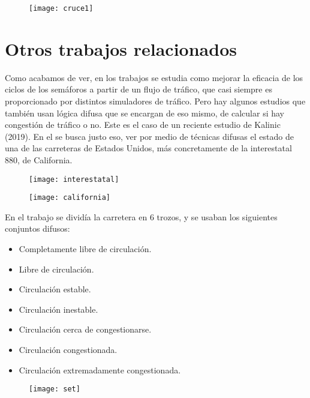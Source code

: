 \begin{figure}[H]
	\centering
	\texttt{[image: cruce1]}

	\label{fig:cruce1}
\end{figure}

\newpage

\section{Otros trabajos relacionados}
Como acabamos de ver, en los trabajos se estudia como mejorar la eficacia de los ciclos de los semáforos a partir de un flujo de tráfico, que casi siempre es proporcionado por distintos simuladores de tráfico. Pero hay algunos estudios que también usan lógica difusa que se encargan de eso mismo, de calcular si hay congestión de tráfico o no. Este es el caso de un reciente estudio de Kalinic \cite{California} (2019). En el se busca justo eso, ver por medio de técnicas difusas el estado de una de las carreteras de Estados Unidos, más concretamente de la interestatal 880, de California.

\begin{multicols}{2}

\begin{figure}[H]
	\centering
	\texttt{[image: interestatal]}
	\label{fig:interestatal}
\end{figure}
\begin{figure}[H]
	\centering
	\texttt{[image: california]}
	\label{fig:california}
\end{figure}

\end{multicols}


\begin{multicols}{2}
	En el trabajo se dividía la carretera en 6 trozos, y se usaban los siguientes conjuntos difusos:
	\begin{itemize}
		\item Completamente libre de circulación.
		\item Libre de circulación.
		\item Circulación estable.
		\item Circulación inestable.
		\item Circulación cerca de congestionarse.
		\item Circulación congestionada.
		\item Circulación extremadamente congestionada.
	\end{itemize}
\begin{figure}[H]
	\centering
	\texttt{[image: set]}
	\label{fig:set}
\end{figure}
\end{multicols}

